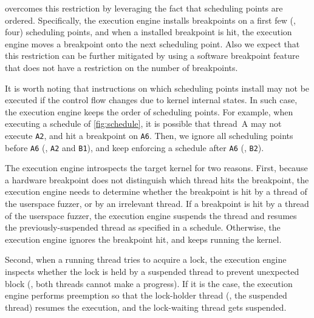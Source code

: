 \sys overcomes this restriction by leveraging the fact that scheduling
points are ordered. Specifically, the execution engine installs
breakpoints on a first few (\eg, four) scheduling points, and when a
installed breakpoint is hit, the execution engine moves a breakpoint
onto the next scheduling point.
%
Also we expect that this restriction can be further mitigated by using
a software breakpoint feature that does not have a restriction on the
number of breakpoints.



%
%




%
It is worth noting that instructions on which scheduling points
install may not be executed if the control flow changes due to kernel
internal states.
%
In such case, the execution engine keeps the order of scheduling
points.
%
\dr{}
For example, when executing a schedule of \autoref{fig:schedule}, it
is possible that thread~A may not execute \texttt{A2}, and hit a
breakpoint on \texttt{A6}.
%
Then, we ignore all scheduling points before \texttt{A6} (\ie,
\texttt{A2} and \texttt{B1}), and keep enforcing a schedule after
\texttt{A6} (\ie, \texttt{B2}).



%
The execution engine introspects the target kernel for two reasons.
%
First, because a hardware breakpoint does not distinguish which thread
hits the breakpoint, the execution engine needs to determine whether
the breakpoint is hit by a thread of the userspace fuzzer, or by an
irrelevant thread.
%
If a breakpoint is hit by a thread of the userspace fuzzer, the
execution engine suspends the thread and resumes the
previously-suspended thread as specified in a schedule.
%
Otherwise, the execution engine ignores the breakpoint hit, and keeps
running the kernel.


Second, when a running thread tries to acquire a lock, the execution
engine inspects whether the lock is held by a suspended thread to
prevent unexpected block (\ie, both threads cannot make a progress).
%
If it is the case, the execution engine performs preemption so that
the lock-holder thread (\ie, the suspended thread) resumes the
execution, and the lock-waiting thread gets suspended.


